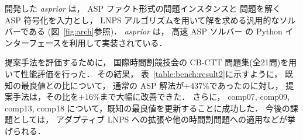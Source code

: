 開発した \textit{asprior} は，
ASP ファクト形式の問題インスタンスと
問題を解く ASP 符号化を入力とし，
LNPS アルゴリズムを用いて解を求める汎用的なソルバーである
(図~\ref{fig:arch}参照)．
\textit{asprior} は，
高速 ASP ソルバー {\clingo}%
の Python インターフェースを利用して実装されている．

提案手法を評価するために，
国際時間割競技会の CB-CTT 問題集(全21問)を用いて性能評価を行った．
その結果，
表~\ref{table:bench:result2}に示すように，
既知の最良値との比について，
通常の ASP 解法が$+437\%$であったのに対し，
提案手法は，その比を$+16\%$まで大幅に改善できた．
%
さらに，
comp07,
comp09,
comp13,
comp18
について，既知の最良値を更新することに成功した．
今後の課題としては，
アダプティブ LNPS への拡張や他の時間割問題への適用などが挙げられる．



